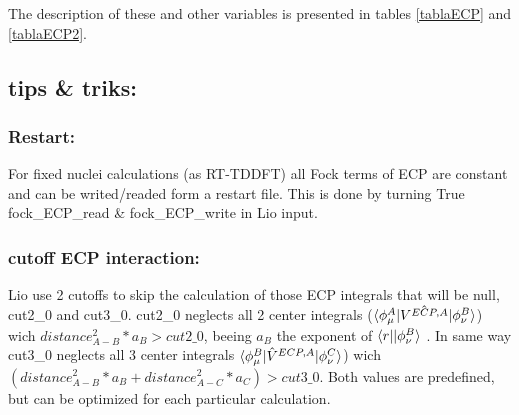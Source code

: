 The description of these and other variables is presented in tables \ref{tablaECP} and \ref{tablaECP2}.

\subsection{tips \& triks:}

\subsubsection{Restart:}
For fixed nuclei calculations (as RT-TDDFT) all Fock terms of ECP are constant and can be writed/readed form a restart file. This is done by turning True fock\_ECP\_read \& fock\_ECP\_write in Lio input.

\subsubsection{cutoff ECP interaction:}
Lio use 2 cutoffs to skip the calculation of those ECP integrals that will be null, cut2\_0 and cut3\_0.
cut2\_0 neglects all 2 center integrals ($\langle\phi_\mu^A\rvert{\hat{V^{ECP,A}}}\lvert\phi_\nu^B\rangle$) wich $distance_{A-B}^2*a_B > cut2\_0$, beeing $a_B$ the exponent of $\langle r\rvert\lvert\phi_\nu^B\rangle$ . In same way cut3\_0 neglects all 3 center integrals $\langle\phi_\mu^B\rvert{\hat{V}^{ECP,A}}\lvert\phi_\nu^C\rangle$) wich $(distance_{A-B}^2*a_B + distance_{A-C}^2*a_C)> cut3\_0$.
Both values are predefined, but can be optimized for each particular calculation.



